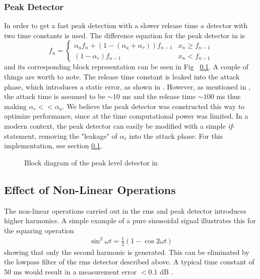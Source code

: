 \documentclass[../main2.tex]{subfiles}
\providecommand{\rootdir}{..}
\begin{document}
\subsubsection{Peak Detector}
In order to get a fast peak detection with a slower release time a detector with two time constants is used. The difference equation for the peak detector in \cite{mcnally1984dynamic} is
\begin{equation}
f_n = \begin{cases}
    \alpha_{a} f_n + (1- (\alpha_{a} + \alpha_{r})) f_{n-1}  	& x_n \geq f_{n-1} \\
    (1-\alpha_{r}) f_{n-1} 								& x_n < f_{n-1}
\end{cases}
\end{equation}
and its corresponding block representation can be seen in Fig ~\ref{}. A couple of things are worth to note. The release time constant is leaked into the attack phase, which introduces a static error, as shown in \cite{giannoulis2012}. However, as mentioned in \cite{mcnally1984dynamic}, the attack time is assumed to be $\sim 10$ ms and the release time   $\sim 100$ ms thus making $\alpha_r << \alpha_a$. We believe the peak detector was constructed this way to optimize performance, since at the time computational power was limited. In a modern context, the peak detector can easily be modified with a simple \emph{if}-statement, removing the "leakage" of $\alpha_r$ into the attack phase. For this implementation, see section \ref{}.
\begin{figure}
\centerline{}
\caption{Block diagram of the peak level detector in \cite{mcnally1984dynamic}}
\label{fig:block_mcnally_theory_rms}
\end{figure}
\subsection{Effect of Non-Linear Operations}
The non-linear operations carried out in the rms and peak detector introduces higher harmonics. A simple example of a pure sinusoidal signal illustrates this for the squaring operation
\begin{align}
\sin^2{\omega t} = \frac{1}{2}(1-\cos{2\omega t}) 
\end{align}
showing that only the second harmonic is generated. This can be eliminated by the lowpass filter of the rms detector described above. A typical time constant of 50 ms would result in a measurement error $< 0.1$ dB \cite{mcnally1984dynamic}.
\end{document}
